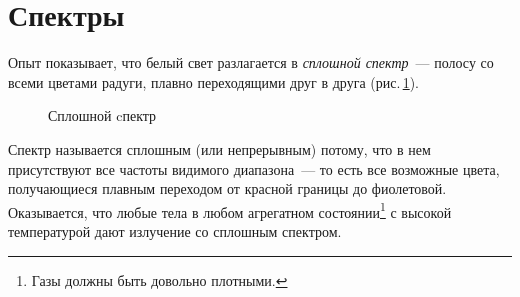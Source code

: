 \documentclass[main.tex]{subfiles}
\begin{document}

\pagestyle{empty}

 

\setcounter{section}{19
}
\addtocounter{section}{-1} 

\section{Спектры}


Опыт показывает, что белый свет разлагается в \emph{сплошной спектр}~--- полосу со всеми цветами радуги, плавно переходящими друг в друга (рис.\,\ref{fig:p202}).

    \begin{figure}[H]
    \centering

\caption{Сплошной cпектр}
\label{fig:p202}
\end{figure}


Спектр называется сплошным (или непрерывным) потому, что в нем присутствуют все частоты видимого диапазона~--- то есть все возможные цвета, получающиеся плавным переходом от красной границы до фиолетовой. Оказывается, что любые тела в любом агрегатном состоянии\footnote{Газы должны быть довольно плотными.} с высокой температурой дают излучение со сплошным спектром.
\end{document}
